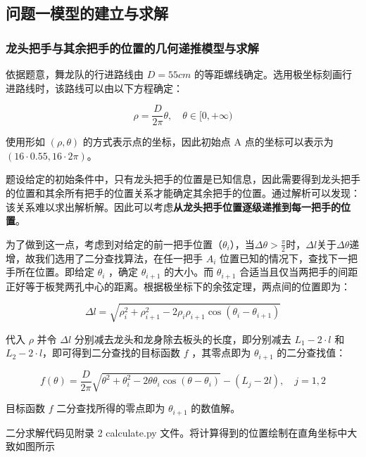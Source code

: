 \documentclass[a4paper]{article}
\begin{document}
	\subsection{问题一模型的建立与求解}
	\subsubsection{龙头把手与其余把手的位置的几何递推模型与求解}

		依据题意，舞龙队的行进路线由 $D = 55cm$ 的等距螺线确定。选用极坐标刻画行进路线时，该路线可以由以下方程确定：

		\begin{equation}
			\rho = \frac{D}{2\pi}\theta, \quad \theta \in [0,+\infty)
		\end{equation}

		使用形如 $(\rho, \theta)$ 的方式表示点的坐标，因此初始点 A 点的坐标可以表示为 $( 16 \cdot 0.55, 16 \cdot 2\pi )$。

		题设给定的初始条件中，只有龙头把手的位置是已知信息，因此需要得到龙头把手的位置和其余所有把手的位置关系才能确定其余把手的位置。通过解析可以发现：该关系难以求出解析解。因此可以考虑\textbf{从龙头把手位置逐级递推到每一把手的位置}。

		为了做到这一点，考虑到对给定的前一把手位置（$\theta_{i}$），当$\Delta \theta > \frac{\pi}{2}$时，$\Delta l$关于$\Delta \theta$递增，故我们选用了二分查找算法，在任一把手 $A_i$ 位置已知的情况下，查找下一把手所在位置。即给定 $\theta_{i}$ ，确定 $\theta_{i+1}$ 的大小。而 $\theta_{i+1}$ 合适当且仅当两把手的间距正好等于板凳两孔中心的距离。根据极坐标下的余弦定理，两点间的位置即为：

		$$\Delta l = \sqrt{\rho_i^2 + \rho_{i+1}^2 - 2\rho_i \rho_{i+1} \cos(\theta_i - \theta_{i+1})}$$

		代入 $\rho$ 并令 $\Delta l$ 分别减去龙头和龙身除去板头的长度，即分别减去 $L_1 - 2 \cdot l$ 和 $L_2 - 2 \cdot l$，即可得到二分查找的目标函数 $f$ ，其零点即为 $\theta_{i+1}$ 的二分查找值：

		\begin{equation}
			f(\theta) = \frac{D}{2\pi} \sqrt{\theta^2 + \theta_i^2 - 2\theta \theta_i \cos(\theta - \theta_i)} - (L_j - 2l), \quad j=1, 2
		\end{equation}

		目标函数 $f$ 二分查找所得的零点即为 $\theta_{i+1}$ 的数值解。

		二分求解代码见附录 2 calculate.py 文件。将计算得到的位置绘制在直角坐标中大致如图所示
		
\end{document}
